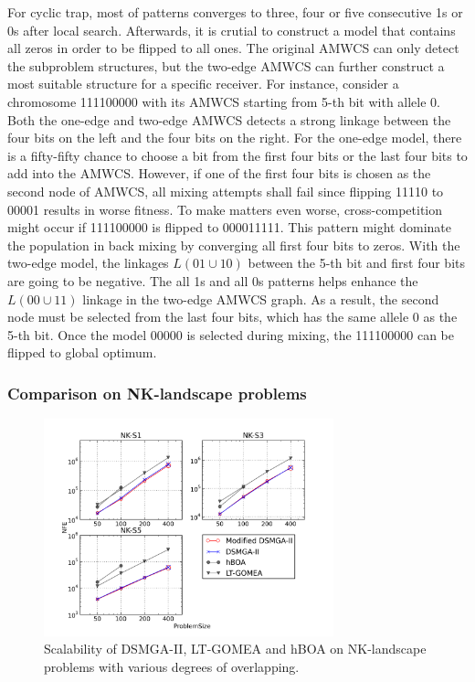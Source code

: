 \documentclass{sig-alternate-05-2015}
\begin{document}
For cyclic trap, most of patterns converges to three, four or five consecutive 1s or 0s after local search.
Afterwards, it is crutial to construct a model that contains all zeros in order to be flipped to all ones. 
The original AMWCS can only detect the subproblem structures, but the two-edge AMWCS can further construct a most suitable structure for a specific receiver. 
For instance, consider a chromosome 111100000 with its AMWCS starting from 5-th bit with allele 0.
Both the one-edge and two-edge AMWCS detects a strong linkage between the four bits on the left and the four bits on the right.
For the one-edge model, there is a fifty-fifty chance to choose a bit from the first four bits or the last four bits to add into the AMWCS. 
However, if one of the first four bits is chosen as the second node of AMWCS, all mixing attempts shall fail since flipping 11110 to 00001 results in worse fitness.
To make matters even worse, cross-competition might occur if 111100000 is flipped to 000011111. 
This pattern might dominate the population in back mixing by converging all first four bits to zeros.
With the two-edge model, the linkages $L(01\cup10)$ between the 5-th bit and first four bits are going to be negative. 
The all 1s and all 0s patterns helps enhance the $L(00\cup11)$ linkage in the two-edge AMWCS graph.
As a result, the second node must be selected from the last four bits, which has the same allele 0 as the 5-th bit.
Once the model 00000 is selected during mixing, the 111100000 can be flipped to global optimum.


\subsubsection{ Comparison on NK-landscape problems }

\begin{figure}
\centering
\includegraphics[width=3.3in]{nkResults}
\caption{Scalability of DSMGA-II, LT-GOMEA and hBOA on NK-landscape problems with various degrees of overlapping.}
\end{figure}
\end{document}
